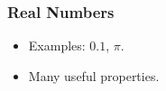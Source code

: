\begin{frame}

\frametitle{Real Numbers}

\begin{itemize}

\item Examples: $0.1$, $\pi$.

\item Many useful properties.

\end{itemize}

\end{frame}
